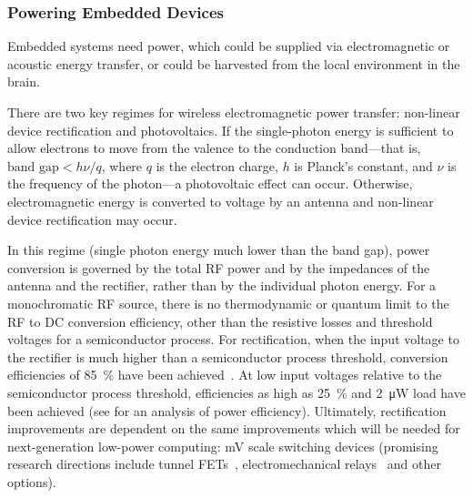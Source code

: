 \subsubsection{Powering Embedded Devices}

Embedded systems need power, which could be supplied via electromagnetic or acoustic energy transfer, or could be harvested from the local environment in the brain.

There are two key regimes for wireless electromagnetic power transfer: non-linear device rectification and photovoltaics.
If the single-photon energy is sufficient to allow electrons to move from the valence to the conduction band---that is, $\text{band gap} < h\nu/q$, where $q$ is the electron charge, $h$ is Planck's constant, and $\nu$ is the frequency of the photon---a photovoltaic effect can occur.
Otherwise, electromagnetic energy is converted to voltage by an antenna and non-linear device rectification may occur.

In this regime (single photon energy much lower than the band gap), power conversion is governed by the total RF power and by the impedances of the antenna and the rectifier, rather than by the individual photon energy.
For a monochromatic RF source, there is no thermodynamic or quantum limit to the RF to DC conversion efficiency, other than the resistive losses and threshold voltages for a semiconductor process.
For rectification, when the input voltage to the rectifier is much higher than a semiconductor process threshold, conversion efficiencies of \SI{85}{\percent} have been achieved~\cite{sun02}.
At low input voltages relative to the semiconductor process threshold, efficiencies as high as \SI{25}{\percent} and \SI{2}{\micro\watt} load have been achieved (see \cite{mandal07} for an analysis of power efficiency).
Ultimately, rectification improvements are dependent on the same improvements which will be needed for next-generation low-power computing: \si{\milli\volt} scale switching devices (promising research directions include tunnel FETs~\cite{ionescu11}, electromechanical relays~\cite{liu12} and other options). 

